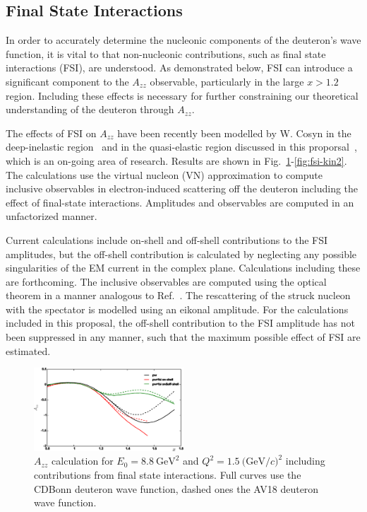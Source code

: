 
\subsection{Final State Interactions}

In order to accurately determine the nucleonic components of the deuteron's wave function, it is vital to that non-nucleonic contributions, such as final state interactions (FSI), are understood. As demonstrated below, FSI can introduce a significant component to the $A_{zz}$ observable, particularly in the large $x>1.2$ region. Including these effects is necessary for further constraining our theoretical understanding of the deuteron through $A_{zz}$.

The effects of FSI on $A_{zz}$ have been recently been modelled by W. Cosyn in the deep-inelastic region~\cite{Cosyn:2014sqa} and in the quasi-elastic region discussed in this proporsal~\cite{cosyn-convo}, which is an on-going area of research. Results are shown in Fig.~\ref{fig:fsi-kin1}-\ref{fig:fsi-kin2}. The calculations use the virtual nucleon (VN) approximation to compute inclusive observables in electron-induced scattering off the deuteron including the 
effect of final-state interactions. Amplitudes and observables are computed in an unfactorized manner.   

Current calculations include on-shell and off-shell contributions to the FSI amplitudes, but the off-shell contribution is calculated 	by neglecting any  possible singularities of the EM current in the complex plane.  Calculations 
including these are forthcoming.  The inclusive observables are computed using 
the optical theorem in a manner analogous to Ref.~\cite{Cosyn:2013uoa}.  The 
rescattering of the struck nucleon with the spectator is modelled using an 
eikonal amplitude.  For the calculations included in this proposal, the off-shell 
contribution to the FSI amplitude has not been suppressed in any manner, such that the maximum possible effect of FSI are estimated.

\begin{figure}[htb]
\begin{center}
  \includegraphics[width=0.5\textwidth]{figs/kin1_cdbonn_av18.eps}
\caption{$A_{zz}$ calculation for $E_0=8.8\mathrm{~GeV}^2$ and $Q^2=1.5\mathrm{~(GeV/}c)^2$ including contributions from final state interactions.  
Full curves use the CDBonn deuteron wave function, dashed ones the AV18 
deuteron wave function.}
\label{fig:fsi-kin1}       %
\end{center}
\end{figure}

